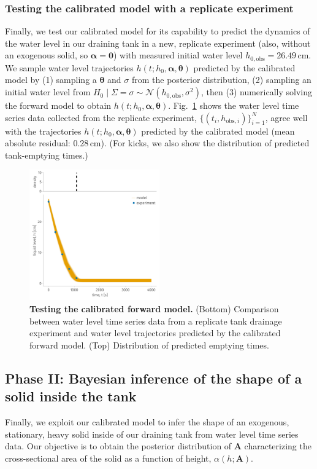 \documentclass[openacc]{rsproca_new}%
\newcommand\thedata {$\{(t_i,h_{\text{obs}, i})\}_{i=1}^{N}$\xspace}
\newcommand\themodel {$h(t; h_0, \boldsymbol \alpha, \boldsymbol\theta)$\xspace}
\begin{document}
\subsubsection{Testing the calibrated model with a replicate experiment}
Finally, we test our calibrated model for its capability to predict the dynamics of the water level in our draining tank in a new, replicate experiment (also, without an exogenous solid, so $\boldsymbol \alpha=\mathbf{0}$) with measured initial water level $h_{0, \text{obs}}=26.49$\,cm. 
We sample water level trajectories \themodel predicted by the calibrated model by (1) sampling a $\boldsymbol \theta$ and $\sigma$ from the posterior distribution, (2) sampling an initial water level from $H_0 \mid \Sigma=\sigma \sim \mathcal{N}(h_{0, \text{obs}}, \sigma^2)$, then (3) numerically solving the forward model to obtain \themodel.
Fig.~\ref{fig:test} shows the water level time series data collected from the replicate experiment, \thedata, agree well with the trajectories \themodel predicted by the calibrated model (mean absolute residual: 0.28\,cm). 
(For kicks, we also show the distribution of predicted tank-emptying times.)

\begin{figure}[h!]
    \centering
    	\includegraphics[width=0.5\textwidth]{../test.pdf}
    \caption{
      \textbf{Testing the calibrated forward model.}
      (Bottom) Comparison between water level time series data from a replicate tank drainage experiment and water level trajectories predicted by the calibrated forward model. 
      (Top) Distribution of predicted emptying times.
      } \label{fig:test}
\end{figure}

\subsection{Phase II: Bayesian inference of the shape of a solid inside the tank} \label{sec:phaseII}
Finally, we exploit our calibrated model to infer the shape of an exogenous, stationary, heavy solid inside of our draining tank from water level time series data.
Our objective is to obtain the posterior distribution of $\mathbf{A}$ characterizing the cross-sectional area of the solid as a function of height, $\alpha(h; \mathbf{A})$.
\end{document}

